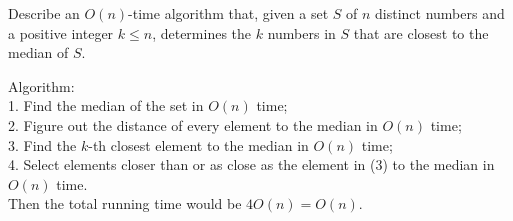 \documentclass[12pt, a4paper, UTF8]{ctexart}
\begin{document}
\begin{problem}[TC: 9.3-7]
  Describe an $O(n)$-time algorithm that, given a set $S$ of $n$ distinct 
  numbers and a positive integer $k\leq n$, determines the $k$ numbers 
  in $S$ that are closest to the median of $S$.
\end{problem}

\begin{solution}
  Algorithm:\\
  1. Find the median of the set in $O(n)$ time;\\
  2. Figure out the distance of every element to the median in $O(n)$ time;\\
  3. Find the $k$-th closest element to the median in $O(n)$ time;\\
  4. Select elements closer than or as close as the element in (3) to the median 
  in $O(n)$ time.\\
  Then the total running time would be $4O(n) = O(n)$.
\end{solution}
\end{document}
